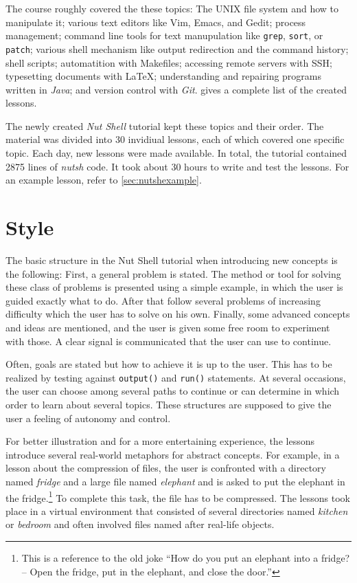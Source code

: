 \documentclass[paper=a4,twoside,abstract=on,cleardoublepage=empty,numbers=noenddot,toc=bib,toc=listof,12pt,appendixprefix=true]{scrreprt}
\begin{document}
The course roughly covered the these topics: The \textsc{UNIX} file system and how to manipulate it; various text editors like Vim, Emacs, and Gedit; process management; command line tools for text manupulation like \texttt{grep}, \texttt{sort}, or \texttt{patch}; various shell mechanism like output redirection and the command history; shell scripts; automatition with Makefiles; accessing remote servers with \textsc{SSH}; typesetting documents with \LaTeX; understanding and repairing programs written in \textit{Java}; and version control with \textit{Git}.  gives a complete list of the created lessons.

The newly created \textit{Nut Shell} tutorial kept these topics and their order. The material was divided into 30 invidiual lessons, each of which covered one specific topic. Each day, new lessons were made available. In total, the tutorial contained 2875 lines of \textit{nutsh} code. It took about 30 hours to write and test the lessons. For an example lesson, refer to \cref{sec:nutshexample}.

\section{Style}

The basic structure in the Nut Shell tutorial when introducing new concepts is the following: First, a general problem is stated. The method or tool for solving these class of problems is presented using a simple example, in which the user is guided exactly what to do. After that follow several problems of increasing difficulty which the user has to solve on his own. Finally, some advanced concepts and ideas are mentioned, and the user is given some free room to experiment with those. A clear signal is communicated that the user can use to continue.

Often, goals are stated but how to achieve it is up to the user. This has to be realized by testing against \texttt{output()} and \texttt{run()} statements. At several occasions, the user can choose among several paths to continue or can determine in which order to learn about several topics. These structures are supposed to give the user a feeling of autonomy and control.

For better illustration and for a more entertaining experience, the lessons introduce several real-world metaphors for abstract concepts. For example, in a lesson about the compression of files, the user is confronted with a directory named \textit{fridge} and a large file named \textit{elephant} and is asked to put the elephant in the fridge.\footnote{This is a reference to the old joke “How do you put an elephant into a fridge? -- Open the fridge, put in the elephant, and close the door.”} To complete this task, the file has to be compressed. The lessons took place in a virtual environment that consisted of several directories named \emph{kitchen} or \emph{bedroom} and often involved files named after real-life objects.
\end{document}
